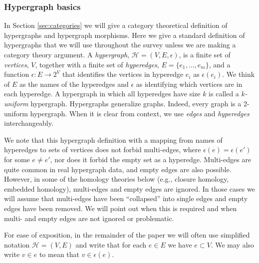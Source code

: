 \documentclass{amsart}
\renewcommand{\H}{\mathcal{H}}
\begin{document}
\subsubsection{Hypergraph basics}
In Section \ref{sec:categories} we will give a category theoretical definition of hypergraphs and hypergraph morphisms. Here we give a standard definition of hypergraphs that we will use throughout the survey unless we are making a category theory argument. A \emph{hypergraph}, $\H=(V, E, \epsilon)$, is a finite set of \emph{vertices}, $V$, together with a finite set of \emph{hyperedges}, $E=\{e_1, \ldots, e_m\}$, and a function $\epsilon : E\rightarrow 2^V$ that identifies the vertices in hyperedge $e_i$ as $\epsilon(e_i)$.
We think of $E$ as the names of the hyperedges and $\epsilon$ as identifying which vertices are in each hyperedge.
A hypergraph in which all hyperedges have size $k$ is called a \emph{$k$-uniform} hypergraph.
Hypergraphs generalize graphs. Indeed, every graph is a 2-uniform hypergraph.
When it is clear from context, we use \emph{edges} and \emph{hyperedges} interchangeably.

We note that this hypergraph definition with a mapping from names of hyperedges to sets of vertices does not forbid multi-edges, where $\epsilon(e) = \epsilon(e')$ for some $e \neq e'$, nor does it forbid the empty set as a hyperedge. Multi-edges are quite common in real hypergraph data, and empty edges are also possible. However, in some of the homology theories below (e.g., closure homology, embedded homology), multi-edges and empty edges are ignored. In those cases we will assume that multi-edges have been ``collapsed'' into single edges and empty edges have been removed.
We will point out when this is required and when multi- and empty edges are not ignored or problematic.

For ease of exposition, in the remainder of the paper we will often use simplified notation $\H=(V, E)$ and write that for each $e \in E$ we have $e \subset V$. We may also write $v \in e$ to mean that $v \in \epsilon(e)$.
\end{document}
